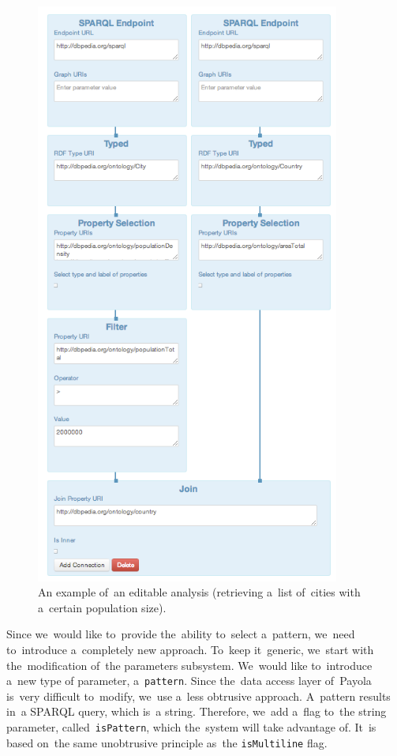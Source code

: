 \begin{figure}
  \centering
    \includegraphics[width=100mm]{img/editable-analysis.png}
  \caption{An example of~an editable analysis (retrieving a~list of~cities with a~certain population size).}
  \label{fig:example-analysis-editable}
\end{figure}

Since we~would like to~provide the~ability to~select a~pattern, we~need to~introduce a~completely new approach. To~keep it~generic, we~start with the~modification of~the parameters subsystem. We~would like to~introduce a~new type 
of parameter, a~\texttt{pattern}. Since the~data access layer of~Payola is~very 
difficult to~modify, we~use a~less obtrusive approach. A~pattern results in~a 
SPARQL query, which is~a string. Therefore, we~add a~flag to~the string 
parameter, called~\texttt{isPattern}, which the~system will take advantage of. It~is based on~the same unobtrusive principle as~the \texttt{isMultiline} flag.

